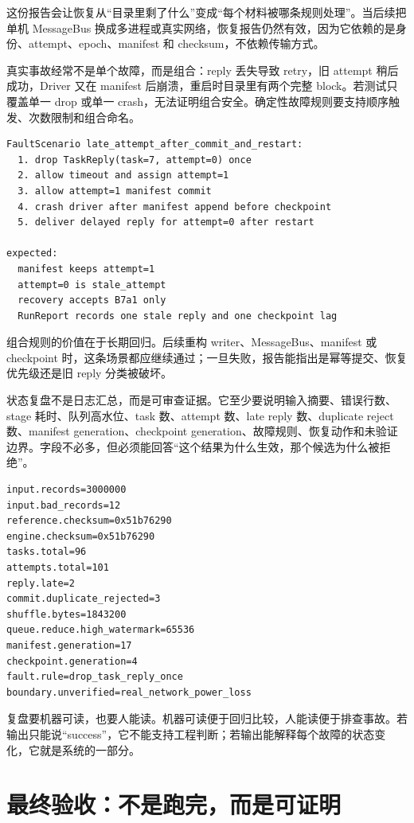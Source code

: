 这份报告会让恢复从“目录里剩了什么”变成“每个材料被哪条规则处理”。当后续把单机 MessageBus 换成多进程或真实网络，恢复报告仍然有效，因为它依赖的是身份、attempt、epoch、manifest 和 checksum，不依赖传输方式。

真实事故经常不是单个故障，而是组合：reply 丢失导致 retry，旧 attempt 稍后成功，Driver 又在 manifest 后崩溃，重启时目录里有两个完整 block。若测试只覆盖单一 drop 或单一 crash，无法证明组合安全。确定性故障规则要支持顺序触发、次数限制和组合命名。

\begin{lstlisting}[numbers=none,caption={组合故障规则示例}]
FaultScenario late_attempt_after_commit_and_restart:
  1. drop TaskReply(task=7, attempt=0) once
  2. allow timeout and assign attempt=1
  3. allow attempt=1 manifest commit
  4. crash driver after manifest append before checkpoint
  5. deliver delayed reply for attempt=0 after restart

expected:
  manifest keeps attempt=1
  attempt=0 is stale_attempt
  recovery accepts B7a1 only
  RunReport records one stale reply and one checkpoint lag
\end{lstlisting}

组合规则的价值在于长期回归。后续重构 writer、MessageBus、manifest 或 checkpoint 时，这条场景都应继续通过；一旦失败，报告能指出是幂等提交、恢复优先级还是旧 reply 分类被破坏。

状态复盘不是日志汇总，而是可审查证据。它至少要说明输入摘要、错误行数、stage 耗时、队列高水位、task 数、attempt 数、late reply 数、duplicate reject 数、manifest generation、checkpoint generation、故障规则、恢复动作和未验证边界。字段不必多，但必须能回答“这个结果为什么生效，那个候选为什么被拒绝”。

\begin{lstlisting}[numbers=none,caption={状态复盘摘要示例}]
input.records=3000000
input.bad_records=12
reference.checksum=0x51b76290
engine.checksum=0x51b76290
tasks.total=96
attempts.total=101
reply.late=2
commit.duplicate_rejected=3
shuffle.bytes=1843200
queue.reduce.high_watermark=65536
manifest.generation=17
checkpoint.generation=4
fault.rule=drop_task_reply_once
boundary.unverified=real_network_power_loss
\end{lstlisting}

复盘要机器可读，也要人能读。机器可读便于回归比较，人能读便于排查事故。若输出只能说“success”，它不能支持工程判断；若输出能解释每个故障的状态变化，它就是系统的一部分。

\section{最终验收：不是跑完，而是可证明}

